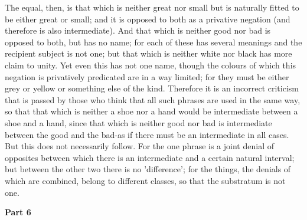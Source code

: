 The equal, then, is that which is neither great nor small but is naturally fitted to be either great or small; and it is opposed to both as a privative negation (and therefore is also intermediate). And that which is neither good nor bad is opposed to both, but has no name; for each of these has several meanings and the recipient subject is not one; but that which is neither white nor black has more claim to unity. Yet even this has not one name, though the colours of which this negation is privatively predicated are in a way limited; for they must be either grey or yellow or something else of the kind. Therefore it is an incorrect criticism that is passed by those who think that all such phrases are used in the same way, so that that which is neither a shoe nor a hand would be intermediate between a shoe and a hand, since that which is neither good nor bad is intermediate between the good and the bad-as if there must be an intermediate in all cases. But this does not necessarily follow. For the one phrase is a joint denial of opposites between which there is an intermediate and a certain natural interval; but between the other two there is no 'difference'; for the things, the denials of which are combined, belong to different classes, so that the substratum is not one.

\textbf{Part 6}

